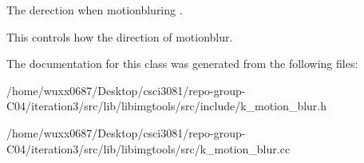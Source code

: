 The derection when motionbluring . 

This controls how the direction of motionblur. 

The documentation for this class was generated from the following files\+:\begin{DoxyCompactItemize}
\item 
/home/wuxx0687/\+Desktop/csci3081/repo-\/group-\/\+C04/iteration3/src/lib/libimgtools/src/include/k\+\_\+motion\+\_\+blur.\+h\item 
/home/wuxx0687/\+Desktop/csci3081/repo-\/group-\/\+C04/iteration3/src/lib/libimgtools/src/k\+\_\+motion\+\_\+blur.\+cc\end{DoxyCompactItemize}
